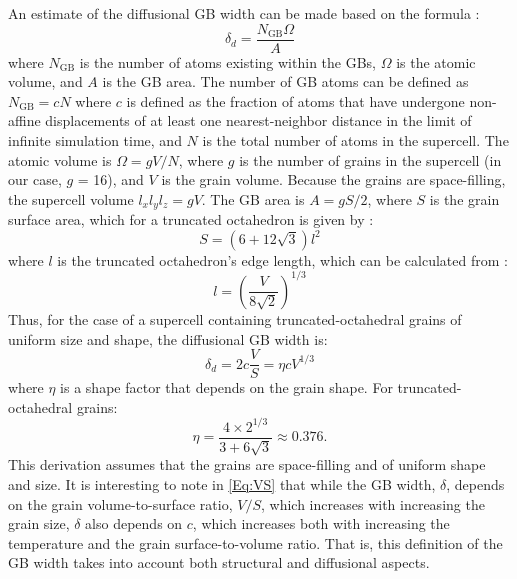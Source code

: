 \documentclass[preprint,12pt,sort&compress]{elsarticle}
\newcommand{\?}{\stackrel{?}{=}}
\begin{document}
An estimate of the diffusional GB width can be made based on the formula \cite{Keblinski1999}:
\begin{equation}
\delta_d = \frac{N_{\mathrm{GB}} \Omega}{A} 
\label{Eq:dNGB}
\end{equation}
where $N_{\mathrm{GB}}$ is the number of atoms existing within the GBs, $\Omega$ is the atomic volume, and $A$ is the GB area. The number of GB atoms can be defined as $N_\mathrm{GB} = c N$ \cite{Haslam2004} where $c$ is defined as the fraction of atoms that have undergone non-affine displacements of at least one nearest-neighbor distance in the limit of infinite simulation time, and $N$ is the total number of atoms in the supercell. The atomic volume is $\Omega = gV/N$, where $g$ is the number of grains in the supercell (in our case, $g$ = 16), and $V$ is the grain volume. Because the grains are space-filling, the supercell volume $l_x l_y l_z = gV$. The GB area is $A = g S / 2$, where $S$ is the grain surface area, which for a truncated octahedron is given by \cite{Weisstein}:
\begin{equation}
S = \left( 6 + 12 \sqrt{3} \right) l^2    
\end{equation}
where $l$ is the truncated octahedron's edge length, which can be calculated from \cite{Weisstein}:
\begin{equation}
l = \left( \frac{V}{8 \sqrt{2}} \right)^{1/3}
\end{equation}
Thus, for the case of a supercell containing truncated-octahedral grains of uniform size and shape, the diffusional GB width is:
\begin{equation}
\delta_d = 2 c \frac{V}{S} = \eta c V^{1/3}
\label{Eq:VS}
\end{equation}
where $\eta$ is a shape factor that depends on the grain shape. For truncated-octahedral grains:
\begin{equation}\label{eq:shape}
\eta = \frac{4 \times 2^{1/3}}{3 + 6 \sqrt{3}} \approx 0.376.
\end{equation}
This derivation assumes that the grains are space-filling and of uniform shape and size. It is interesting to note in \cref{Eq:VS} that while the GB width, $\delta$, depends on the grain volume-to-surface ratio, $V/S$, which increases with increasing the grain size, $\delta$ also depends on $c$, which increases both with increasing the temperature and the grain surface-to-volume ratio. That is, this definition of the GB width takes into account both structural and diffusional aspects.



\end{document}
